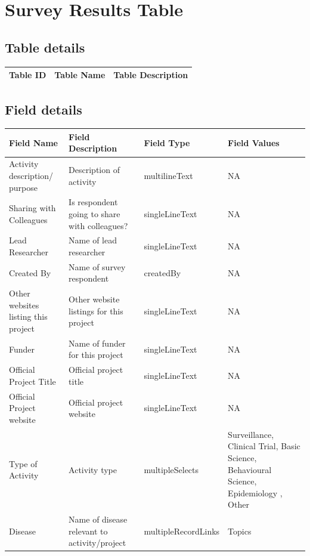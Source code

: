 \documentclass[
]{book}
\begin{document}
\hypertarget{survey-results-table}{%
\section{Survey Results Table}\label{survey-results-table}}

\hypertarget{table-details-8}{%
\subsection{Table details}\label{table-details-8}}

\begin{table}
\centering
\begin{tabular}{l|l|l}
\hline
\textbf{Table ID} & \textbf{Table Name} & \textbf{Table Description}\\


\hline
\end{tabular}
\end{table}

\hypertarget{field-details-5}{%
\subsection{Field details}\label{field-details-5}}

\begin{table}
\centering
\begin{tabular}{l|l|l|l}
\hline
\textbf{Field Name} & \textbf{Field Description} & \textbf{Field Type} & \textbf{Field Values}\\
\hline
Activity description/ purpose & Description of activity & multilineText & NA\\
\hline
Sharing with Colleagues & Is respondent going to share with colleagues? & singleLineText & NA\\
\hline
Lead Researcher & Name of lead researcher & singleLineText & NA\\
\hline
Created By & Name of survey respondent & createdBy & NA\\
\hline
Other websites listing this project & Other website listings for this project & singleLineText & NA\\
\hline
Funder & Name of funder for this project & singleLineText & NA\\
\hline
Official Project Title & Official project title & singleLineText & NA\\
\hline
Official Project website & Official project website & singleLineText & NA\\
\hline
Type of Activity & Activity type & multipleSelects & Surveillance, Clinical Trial, Basic Science, Behavioural Science, Epidemiology , Other\\
\hline
Disease & Name of disease relevant to activity/project & multipleRecordLinks & Topics\\
\hline
\end{tabular}
\end{table}
\end{document}

